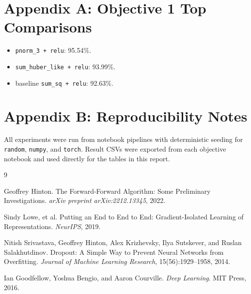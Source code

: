 \documentclass[sigconf]{acmart}
\begin{document}
\appendix

\section{Appendix A: Objective 1 Top Comparisons}
\begin{itemize}
  \item \texttt{pnorm\_3 + relu}: 95.54\%.
  \item \texttt{sum\_huber\_like + relu}: 93.99\%.
  \item baseline \texttt{sum\_sq + relu}: 92.63\%.
\end{itemize}

\section{Appendix B: Reproducibility Notes}
All experiments were run from notebook pipelines with deterministic seeding for \texttt{random}, \texttt{numpy}, and \texttt{torch}. Result CSVs were exported from each objective notebook and used directly for the tables in this report.

\begin{thebibliography}{9}

Geoffrey Hinton.
\newblock The Forward-Forward Algorithm: Some Preliminary Investigations.
\newblock \emph{arXiv preprint arXiv:2212.13345}, 2022.

Sindy Lowe, et al.
\newblock Putting an End to End to End: Gradient-Isolated Learning of Representations.
\newblock \emph{NeurIPS}, 2019.

Nitish Srivastava, Geoffrey Hinton, Alex Krizhevsky, Ilya Sutskever, and Ruslan Salakhutdinov.
\newblock Dropout: A Simple Way to Prevent Neural Networks from Overfitting.
\newblock \emph{Journal of Machine Learning Research}, 15(56):1929--1958, 2014.

Ian Goodfellow, Yoshua Bengio, and Aaron Courville.
\newblock \emph{Deep Learning}.
\newblock MIT Press, 2016.

\end{thebibliography}
\end{document}
